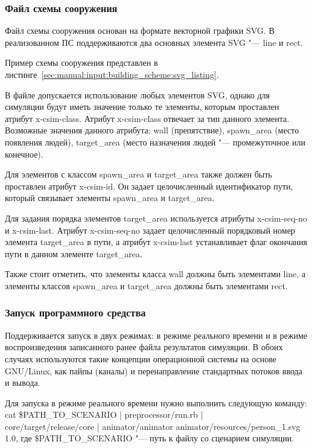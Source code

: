 \subsubsection{Файл схемы сооружения}
\label{sec:manual:input:building_scheme}

Файл схемы сооружения основан на формате векторной графики SVG.
В реализованном ПС поддерживаются два основных элемента SVG "--- line и rect.

Пример схемы сооружения представлен в листинге~\ref{sec:manual:input:building_scheme:svg_listing}.



В файле допускается использование любых элементов SVG, однако для симуляции будут иметь значение только те элементы, которым проставлен атрибут x-csim-class.
Атрибут x-csim-class отвечает за тип данного элемента.  Возможные значения данного атрибута:
  wall (препятствие),
  spawn\_area (место появления людей),
  target\_area (место назначения людей "--- промежуточное или конечное).

Для элементов с классом spawn\_area и target\_area также должен быть проставлен атрибут x-csim-id.
Он задает целочисленный идентификатор пути, который связывает элементы spawn\_area и target\_area.

Для задания порядка элементов target\_area используется атрибуты x-csim-seq-no и x-csim-last.
Атрибут x-csim-seq-no задает целочисленный порядковый номер элемента target\_area в пути,
а атрибут x-csim-last устанавливает флаг окончания пути в данном элементе target\_area.

Также стоит отметить, что элементы класса wall должны быть элементами line,
а элементы классов spawn\_area и target\_area должны быть элементами rect.

\subsubsection{Запуск программного средства}
\label{sec:manual:launch}

Поддерживается запуск в двух режимах: в режиме реального времени и в режиме воспроизведения записанного ранее файла результатов симуляции.
В обоих случаях используются такие концепции операционной системы на основе GNU/Linux, как пайпы (каналы) и перенаправление стандартных потоков ввода и вывода.

Для запуска в режиме реального времени нужно выполнить следующую команду:
cat \$PATH\_TO\_SCENARIO \-|\- preprocessor/run.rb \-|\- \\ core/target/release/core \-|\- animator/animator animator/resources/person\_1.svg 1.0,
где \$PATH\_TO\_SCENARIO "--- путь к файлу со сценарием симуляции.

